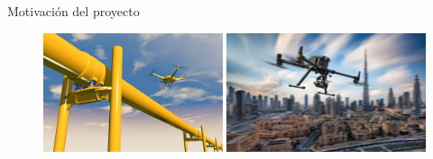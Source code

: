 \documentclass[
  24pt, %
  aspectratio=169, %
]{beamer}
\begin{document}
\begin{frame}{Motivación del proyecto}
\begin{figure}[ht!]
\begin{minipage}{0.48\textwidth}
            \centering
            \includegraphics[width=\linewidth,height=3.5cm]{pipe_drone.jpg} %
        \end{minipage}\hfill
        \begin{minipage}{0.48\textwidth}
            \centering
            \includegraphics[width=\linewidth,height=3.5cm]{drone_city.jpg} %
        \end{minipage}
    \end{figure}
\end{frame}
\end{document}

